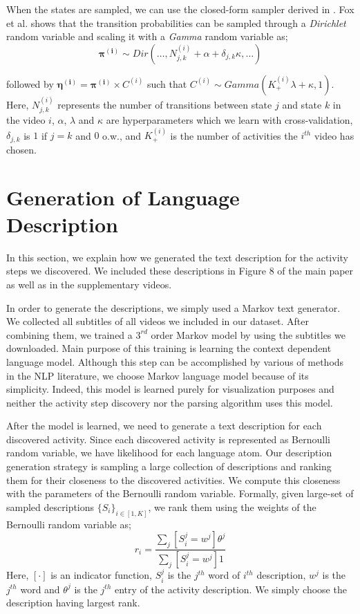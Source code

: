 \documentclass[10pt,twocolumn,letterpaper]{article}
\begin{document}
When the states are sampled, we can use the closed-form sampler derived in \cite{foxBPHMM}. Fox et al.\cite{foxBPHMM} shows that the transition probabilities can be sampled through a \emph{Dirichlet} random variable and scaling it with a \emph{Gamma} random variable as;
\begin{equation}
  \mathbf{\pi^{(i)}} \sim Dir(\ldots,N^{(i)}_{j,k}+\alpha+\delta_{j,k}\kappa,\ldots)
\end{equation}

followed by \mbox{$\mathbf{\eta^{(i)}}=\mathbf{\pi^{(i)}} \times C^{(i)}$} such that \mbox{$C^{(i)} \sim Gamma( K^{(i)}_+\lambda +\kappa,1)$}. Here, $N^{(i)}_{j,k}$ represents the number of transitions between state $j$ and state $k$ in the video $i$, $\alpha$, $\lambda$ and $\kappa$ are hyperparameters which we learn with cross-validation, $\delta_{j,k}$ is $1$ if $j=k$ and $0$ o.w., and $K^{(i)}_+$ is the number of activities the $i^{th}$ video has chosen.

\section{Generation of Language Description}
In this section, we explain how we generated the text description for the activity steps we discovered. We included these descriptions in Figure 8 of the main paper as well as in the supplementary videos.

In order to generate the descriptions, we simply used a Markov text generator. We collected all subtitles of all videos we included in our dataset. After combining them, we trained a $3^{rd}$ order Markov model by using the subtitles we downloaded. Main purpose of this training is learning the context dependent language model. Although this step can be accomplished by various of methods in the NLP literature, we choose Markov language model because of its simplicity. Indeed, this model is learned purely for visualization purposes and neither the activity step discovery nor the parsing algorithm uses this model.

After the model is learned, we need to generate a text description for each discovered activity. Since each discovered activity is represented as Bernoulli random variable, we have likelihood for each language atom. Our description generation strategy is sampling a large collection of descriptions and ranking them for their closeness to the discovered activities. We compute this closeness with the parameters of the Bernoulli random variable. Formally, given large-set of sampled descriptions $\{S_i\}_{i \in [1,K]}$, we rank them using the weights of the Bernoulli random variable as;
\[
r_i = \frac{\sum_{j} \left[S_i^j = w^j\right]\theta^j}{\sum_{j} \left[S_i^j = w^j\right]1}
\]
Here, $\left[\cdot\right]$ is an indicator function, $S_i^j$ is the $j^{th}$ word of $i^{th}$ description, $w^j$ is the $j^{th}$ word and $\theta^j$ is the $j^{th}$ entry of the activity description. We simply choose the description having largest rank.

{\small


}
\end{document}
